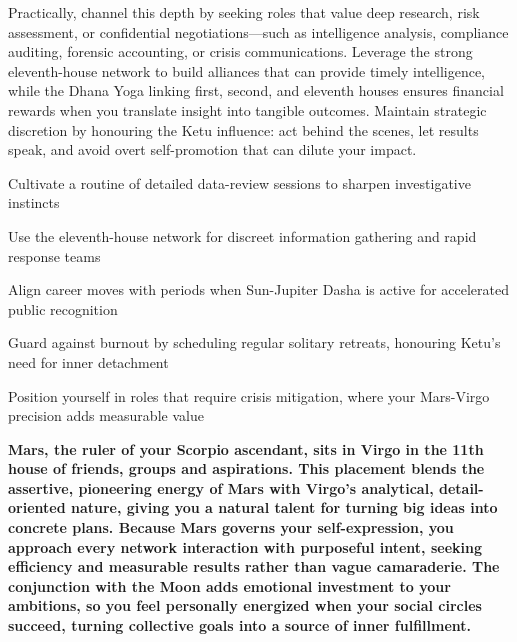 {\fontsize{9}{13}\selectfont Practically, channel this depth by seeking roles that value deep research, risk assessment, or confidential negotiations---such as intelligence analysis, compliance auditing, forensic accounting, or crisis communications. Leverage the strong eleventh-house network to build alliances that can provide timely intelligence, while the Dhana Yoga linking first, second, and eleventh houses ensures financial rewards when you translate insight into tangible outcomes. Maintain strategic discretion by honouring the Ketu influence: act behind the scenes, let results speak, and avoid overt self-promotion that can dilute your impact.}\par\vspace{1.8mm}

\begin{diamondlist}
  \item {\fontsize{8.5}{12}\selectfont Cultivate a routine of detailed data-review sessions to sharpen investigative instincts}
  \item {\fontsize{8.5}{12}\selectfont Use the eleventh-house network for discreet information gathering and rapid response teams}
  \item {\fontsize{8.5}{12}\selectfont Align career moves with periods when Sun-Jupiter Dasha is active for accelerated public recognition}
  \item {\fontsize{8.5}{12}\selectfont Guard against burnout by scheduling regular solitary retreats, honouring Ketu's need for inner detachment}
  \item {\fontsize{8.5}{12}\selectfont Position yourself in roles that require crisis mitigation, where your Mars-Virgo precision adds measurable value}
\end{diamondlist}


\label{topic8}

{\fontsize{9.5}{13.8}\selectfont\bfseries\color{DeepSlate} Mars, the ruler of your Scorpio ascendant, sits in Virgo in the 11th house of friends, groups and aspirations. This placement blends the assertive, pioneering energy of Mars with Virgo's analytical, detail-oriented nature, giving you a natural talent for turning big ideas into concrete plans. Because Mars governs your self-expression, you approach every network interaction with purposeful intent, seeking efficiency and measurable results rather than vague camaraderie. The conjunction with the Moon adds emotional investment to your ambitions, so you feel personally energized when your social circles succeed, turning collective goals into a source of inner fulfillment.}\par\vspace{2mm}

